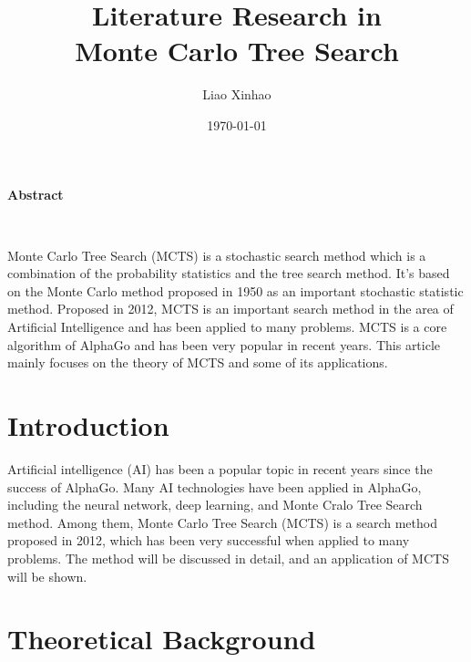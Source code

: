 \documentclass[a4paper,12pt]{article}
\begin{document}
\begin{titlepage}


\title{\vspace{5cm}\vspace{1cm}\textbf{Literature Research in \\
Monte Carlo Tree Search}\vspace{0.8cm}}
\author{ Liao Xinhao}
\date{\today}
\maketitle
\vspace{1cm}
\begin{center}
\begin{Large}
\textbf{Abstract}
\end{Large}\\

\end{center}

Monte Carlo Tree Search (MCTS) is a stochastic search method which is a combination of the probability statistics and the tree search method. It's based on the Monte Carlo method proposed in 1950 as an important stochastic statistic method. Proposed in 2012, MCTS is an important search method in the area of Artificial Intelligence and
has been applied to many problems. MCTS is a core algorithm of AlphaGo and has been very popular in recent years. This article mainly focuses on the theory of MCTS and some of its applications.


\thispagestyle{empty}
\end{titlepage}
\setcounter{page}{1}


\newpage

\section{Introduction}
Artificial intelligence (AI) has been a popular topic in recent years since the success of AlphaGo. Many AI technologies have been applied in AlphaGo, including the neural network, deep learning, and Monte Cralo Tree Search method. Among them, Monte Carlo Tree Search (MCTS) is a search method proposed in 2012, which has been very successful when applied to many problems. The method will be discussed in detail, and an application of MCTS will be shown. 

\section{Theoretical Background}
\end{document}

